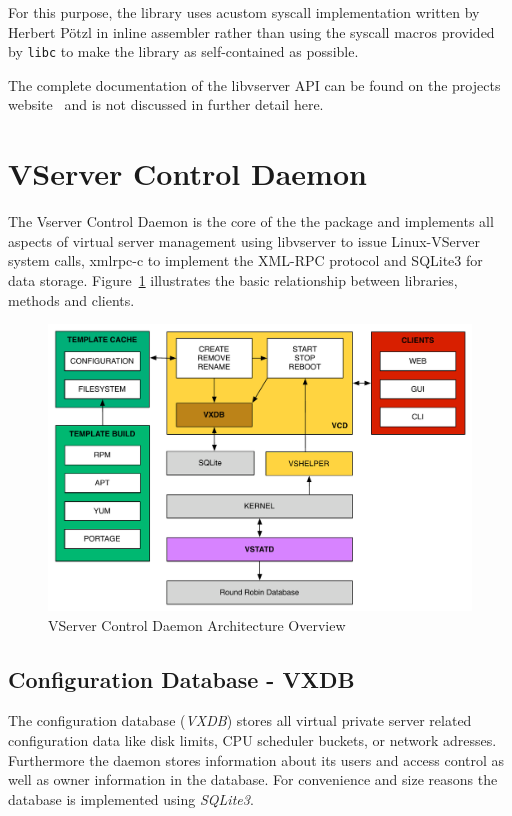 For this purpose, the library uses acustom  syscall implementation written by
Herbert Pötzl in inline assembler rather than using the syscall macros provided
by \texttt{libc} to make the library as self-contained as possible.

The complete documentation of the libvserver API can be found on the projects
website~\cite{libvserver-doc} and is not discussed in further detail here.


\section{VServer Control Daemon}
\label{sec:intro:vcd:vcd}

The Vserver Control Daemon is the core of the the package and implements all
aspects of virtual server management using libvserver to issue Linux-VServer
system calls, xmlrpc-c to implement the XML-RPC protocol and SQLite3 for data
storage. Figure~\ref{fig:vcd-overview} illustrates the basic relationship
between libraries, methods and clients.

\begin{figure}[hbt]
	\center
	\includegraphics[scale=0.4]{intro/vcd}
	\caption{VServer Control Daemon Architecture Overview}
	\label{fig:vcd-overview}
\end{figure}


\subsection{Configuration Database - VXDB}

The configuration database (\emph{VXDB}) stores all virtual private server
related configuration data like disk limits, CPU scheduler buckets, or network
adresses. Furthermore the daemon stores information about its users and access
control as well as owner information in the database. For convenience and size
reasons the database is implemented using \emph{SQLite3}.

